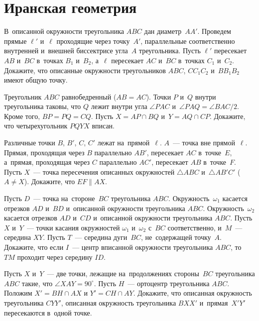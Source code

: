
\section*{Иранская геометрия}


\begin{problems}

\item
В~описанной окружности треугольника $ABC$ дан диаметр~$AA'$.
Проведем прямые $\ell'$ и~$\ell$ проходящие через точку~$A'$,
параллельные соответственно внутренней и~внешней биссектрисе угла~$A$
треугольника.
Пусть $\ell'$ пересекает $AB$ и~$BC$ в~точках $B_1$ и~$B_2$, а~$\ell$
пересекает $AC$ и~$BC$ в~точках $C_1$ и~$C_2$.
Докажите, что описанные окружности треугольников $ABC$, $C C_1 C_2$
и~$B B_1 B_2$ имеют общую точку.

\item
Треугольник $ABC$ равнобедренный ($AB = AC$).
Точки $P$ и~$Q$ внутри треугольника таковы, что $Q$ лежит внутри
угла $\angle PAC$ и~$\angle PAQ = \angle BAC / 2$.
Кроме того, $BP = PQ = CQ$.
Пусть $X = AP \cap BQ$ и~$Y = AQ \cap CP$.
Докажите, что четырехугольник $PQYX$ вписан.

\item
Различные точки $B$, $B'$, $C$, $C'$ лежат на~прямой~$\ell$.
$A$~--- точка вне прямой~$\ell$.
Прямая, проходящая через $B$ параллельно $AB'$, пересекает $AC$ в~точке~$E$,
а~прямая, проходящая через $C$ параллельно $AC'$, пересекает $AB$ в~точке~$F$.
Пусть $X$~--- точка пересечения описанных окружностей $\triangle ABC$
и~$\triangle AB'C'$ ($A \neq X$).
Докажите, что $EF \parallel AX$.

\item
Пусть $D$~--- точка на~стороне~$BC$ треугольника $ABC$.
Окружность~$\omega_1$ касается отрезков $AD$ и~$BD$ и~описанной окружности
треугольника $ABC$.
Окружность~$\omega_2$ касается отрезков $AD$ и~$CD$ и~описанной окружности
треугольника $ABC$.
Пусть $X$ и~$Y$~--- точки касания окружностей $\omega_1$ и~$\omega_2$ с~$BC$
соответственно, и~$M$~--- середина $XY$.
Пусть $T$~--- середина дуги~$BC$, не~содержащей точку~$A$.
Докажите, что если $I$~--- центр вписанной окружности треугольника
$ABC$, то~$TM$ проходит через середину $ID$.

\item
Пусть $X$ и~$Y$~--- две точки, лежащие на~продолжениях стороны~$BC$
треугольника $ABC$ такие, что $\angle XAY = 90^\circ$.
Пусть $H$~--- ортоцентр треугольника $ABC$.
Положим $X' = BH \cap AX$ и $Y' = CH \cap AY$.
Докажите, что описанная окружность треугольника $CYY'$, описанная окружность
треугольника $BXX'$ и~прямая~$X'Y'$ пересекаются в~одной точке.


\end{problems}
